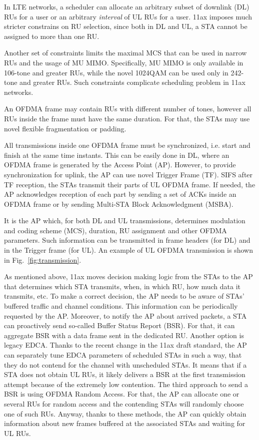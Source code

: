 In LTE networks, a scheduler can allocate an arbitrary subset of downlink (DL) RUs for a user or an arbitrary \emph{interval} of UL RUs for a user.
11ax imposes much stricter constrains on RU selection, since both in DL and UL, a STA cannot be assigned to more than one RU.

Another set of constraints limits the maximal MCS that can be used in narrow RUs and the usage of MU MIMO.
Specifically, MU MIMO is only available in 106-tone and greater RUs, while the novel 1024QAM can be used only in 242-tone and greater RUs.
Such constraints complicate scheduling problem in 11ax networks.

An OFDMA frame may contain RUs with different number of tones, however all RUs inside the frame must have the same duration.
For that, the STAs may use novel flexible fragmentation or padding. 

All transmissions inside one OFDMA frame must be synchronized, i.e. start and finish at the same time instants.
This can be easily done in DL, where an OFDMA frame is generated by the Access Point (AP).
However, to provide synchronization for uplink, the AP can use novel Trigger Frame (TF).
SIFS after TF reception, the STAs transmit their parts of UL OFDMA frame.
If needed, the AP acknowledges reception of each part by sending a set of ACKs inside an OFDMA frame or by sending Multi-STA Block Acknowledgment (MSBA).

It is the AP which, for both DL and UL transmissions, determines modulation and coding scheme (MCS), duration, RU assignment and other OFDMA parameters. Such information can be transmitted in frame headers (for DL) and in the Trigger frame (for UL). An example of UL OFDMA transmission is shown in Fig.~\ref{fig:transmission}. 

As mentioned above, 11ax moves decision making logic from the STAs to the AP that determines which STA transmits, when, in which RU, how much data it transmits, etc.
To make a correct decision, the AP needs to be aware of STAs' buffered traffic and channel conditions.
This information can be periodically requested by the AP.
Moreover, to notify the AP about arrived packets, a STA can proactively send so-called Buffer Status Report (BSR).
For that, it can aggregate BSR with a data frame sent in the dedicated RU.
Another option is legacy EDCA.
Thanks to the recent change in the 11ax draft standard, the AP can separately tune EDCA parameters of scheduled STAs in such a way, that they do not contend for the channel with unscheduled STAs.
It means that if a STA does not obtain UL RUs, it likely delivers a BSR at the first transmission attempt because of the extremely low contention.
The third approach to send a BSR is using OFDMA Random Access.
For that, the AP can allocate one or several RUs for random access and the contending STAs will randomly choose one of such RUs. 
Anyway, thanks to these methods, the AP can quickly obtain information about new frames buffered  at the associated STAs and waiting for UL RUs.

